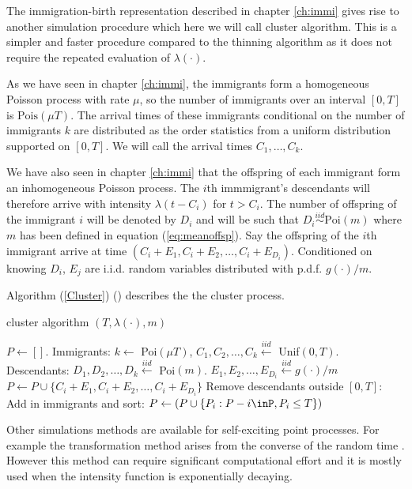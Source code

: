 \documentclass[11pt,a4paper]{article}
\begin{document}
The immigration-birth representation described in chapter \ref{ch:immi} gives rise to another simulation procedure which here we will call cluster algorithm. This is a simpler and faster procedure compared to the thinning algorithm as it does not require the repeated evaluation of $\lambda(\cdot)$.

As we have seen in chapter \ref{ch:immi}, the immigrants form a homogeneous Poisson process with rate $\mu$, so the number of immigrants over an interval $[0, T]$ is $\text{Pois}(\mu T)$. The arrival times of these immigrants conditional on the number of immigrants $k$ are distributed as the order statistics from a uniform distribution supported on $[0, T]$. We will call the arrival times $C_1, \dots, C_k$.

We have also seen in chapter \ref{ch:immi} that the offspring of each immigrant form an inhomogeneous Poisson process. The $i$th immmigrant's descendants will therefore arrive with intensity $\lambda(t-C_i)$ for $t > C_i$. The number of offspring of the immigrant $i$ will be denoted by $D_i$ and will be such that $D_i \overset{iid}{\sim}\text{Poi}(m)$ where $m$ has been defined in equation (\ref{eq:meanoffsp}). Say the offspring of the $i$th immigrant arrive at time $(C_i + E_1, C_i + E_2, \dots, C_i + E_{D_i})$. Conditioned on knowing $D_i$, $E_j$ are i.i.d. random variables distributed with p.d.f. $g(\cdot)/m$.


Algorithm (\ref{Cluster}) (\cite{Laub}) describes the the cluster process.


\begin{algorithm}[H]
    \caption{cluster algorithm $(T, \lambda(\cdot), m)$}\label{Cluster}
    \begin{algorithmic}
        \Statex $P \gets []$.
        \Statex Immigrants: $k \gets$ Poi$(\mu T)$, $C_1, C_2, \dots, C_k \stackrel{iid}{\gets}$ Unif$(0,T)$.
        \Statex Descendants: $D_1, D_2, \dots, D_k \stackrel{iid}{\gets}$ Poi$(m)$.
                \State $E_1, E_2, \dots, E_{D_i} \stackrel{iid}{\gets} g(\cdot)/m$
                \State $P \gets P \cup \{ C_i + E_1, C_i + E_2, \dots, C_i + E_{D_i}\}$
            \EndIf
        \EndFor
        \Statex Remove descendants outside $[0,T]$:
        \Statex Add in immigrants and sort: $P \gets(P \cup \{ P_i:P-i \inP, P_i \leq T \})$
        \State {}
    \end{algorithmic}
\end{algorithm}

Other simulations methods are available for self-exciting point processes. For example the transformation method arises from the converse of the random time \cite{Laub}. However this method can require significant computational effort and it is mostly used when the intensity function is exponentially decaying. 
\end{document}
